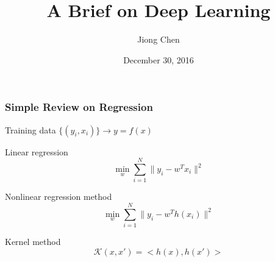 \documentclass[serif,mathserif]{beamer}
\author[Jiong Chen]{Jiong Chen}
\title[\hspace{2em}\insertframenumber/\inserttotalframenumber]{A Brief on Deep Learning}
\date{December 30, 2016}
\newcommand{\BOLD}[1]{\mathbf{#1}}
\begin{document}
\maketitle

\begin{frame}
  \frametitle{Simple Review on Regression}
  \begin{itemize}
     {\item Training data $\{(y_i, x_i)\}\rightarrow y = f(x)$}
     {\item Linear regression
    \begin{equation*}
      \min_{w} \sum_{i=1}^N \|y_i - w^Tx_i\|^2
    \end{equation*}
    }
     {\item Nonlinear regression method
    \begin{equation*}
      \min_{w} \sum_{i=1}^N \|y_i - w^Th(x_i) \|^2
    \end{equation*}
    }
     {\item Kernel method
    \begin{equation*}
      \mathcal{K}(x, x') = <h(x), h(x')>
    \end{equation*}
    }
  \end{itemize}
\end{frame}
\end{document}
